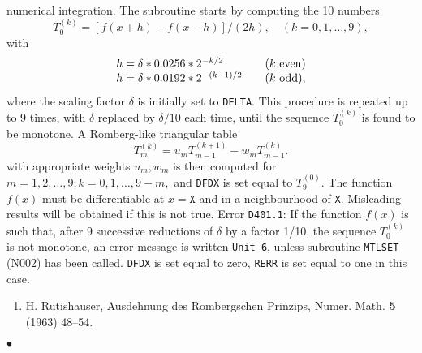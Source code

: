 numerical integration. The subroutine starts by computing the 10 numbers
$$ T_0^{(k)} = [f(x+h)-f(x-h)]/(2h), \quad (k = 0,1,\ldots,9),$$
with
$$\begin{array}{l@{\qquad}l}
h = \delta*0.0256*2^{-k/2} & (k \ \mbox{\rm even}) \\
h = \delta*0.0192*2^{-(k-1)/2} & (k \ \mbox{\rm odd}),
\end{array}$$
where the scaling factor $\delta$ is initially set to {\tt DELTA}.
This procedure is repeated up to 9 times, with $\delta$ replaced by
$\delta/10$ each time, until the sequence $T_0^{(k)}$ is found to be
monotone. A Romberg-like triangular table
$$ T_m^{(k)} = u_mT_{m-1}^{(k+1)} - w_mT_{m-1}^{(k)}.$$
with appropriate weights $u_m,w_m$ is then computed for $m = 1,2,\ldots,
9; k = 0,1,\ldots,9-m,$ and {\tt DFDX} is set equal to $T_9^{(0)}$.
\Restrict
The function $f(x)$ must be differentiable at $x=\mathtt{X}$ and in a
neighbourhood of {\tt X}. Misleading results will be obtained if this is
not true.
\Errorh
Error {\tt D401.1}:
If the function $f(x)$ is such that, after 9 successive reductions of
$\delta$ by a factor 1/10, the sequence $T_0^{(k)}$ is not monotone,
an error message is written {\tt Unit 6}, unless subroutine
{\tt MTLSET} (N002) has been called. {\tt DFDX} is set equal to zero,
{\tt RERR} is set equal to one in this case.
\Refer
\begin{enumerate}
\item  H. Rutishauser, Ausdehnung des Rombergschen Prinzips,
Numer. Math. {\bf 5} (1963) 48--54.
\end{enumerate}
$\bullet$
